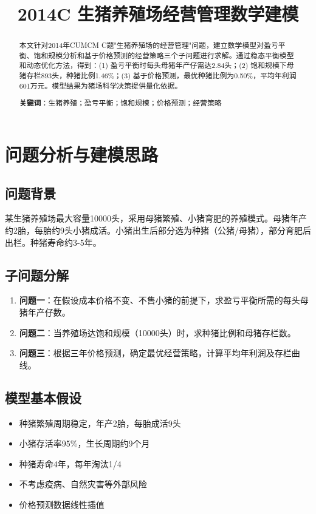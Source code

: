 \documentclass[12pt,a4paper]{article}
\title{2014C 生猪养殖场经营管理数学建模}
\author{}
\date{}
\begin{document}
\maketitle

\begin{abstract}
本文针对2014年CUMCM C题"生猪养殖场的经营管理"问题，建立数学模型对盈亏平衡、饱和规模分析和基于价格预测的经营策略三个子问题进行求解。通过稳态平衡模型和动态优化方法，得到：(1) 盈亏平衡时每头母猪年产仔需达2.84头；(2) 饱和规模下母猪存栏893头，种猪比例1.46\%；(3) 基于价格预测，最优种猪比例为0.50\%，平均年利润601万元。模型结果为猪场科学决策提供量化依据。

\textbf{关键词}：生猪养殖；盈亏平衡；饱和规模；价格预测；经营策略
\end{abstract}

\section{问题分析与建模思路}

\subsection{问题背景}
某生猪养殖场最大容量10000头，采用母猪繁殖、小猪育肥的养殖模式。母猪年产约2胎，每胎约9头小猪成活。小猪出生后部分选为种猪（公猪/母猪），部分育肥后出栏。种猪寿命约3-5年。

\subsection{子问题分解}
\begin{enumerate}
    \item \textbf{问题一}：在假设成本价格不变、不售小猪的前提下，求盈亏平衡所需的每头母猪年产仔数。
    \item \textbf{问题二}：当养殖场达饱和规模（10000头）时，求种猪比例和母猪存栏数。
    \item \textbf{问题三}：根据三年价格预测，确定最优经营策略，计算平均年利润及存栏曲线。
\end{enumerate}

\subsection{模型基本假设}
\begin{itemize}
    \item 种猪繁殖周期稳定，年产2胎，每胎成活9头
    \item 小猪存活率95\%，生长周期约9个月
    \item 种猪寿命4年，每年淘汰1/4
    \item 不考虑疫病、自然灾害等外部风险
    \item 价格预测数据线性插值
\end{itemize}
\end{document}
